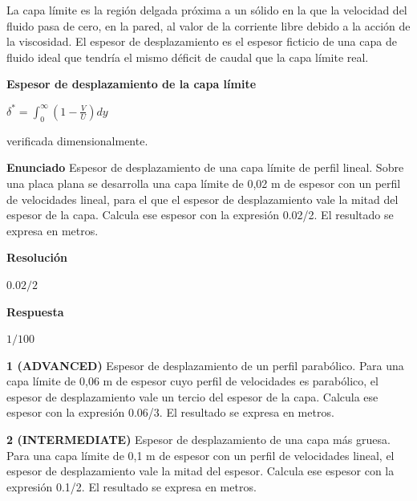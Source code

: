 \documentclass{book}
\begin{document}
\begin{tcolorbox}[title={Definición}, studiumdef, breakable]

La capa límite es la región delgada próxima a un sólido en la que la velocidad del fluido pasa de cero, en la pared, al valor de la corriente libre debido a la acción de la viscosidad. El espesor de desplazamiento es el espesor ficticio de una capa de fluido ideal que tendría el mismo déficit de caudal que la capa límite real.
\end{tcolorbox}

\begin{tcolorbox}[title={Derivaciones}, studiumdef, breakable]

\noindent\textbf{Espesor de desplazamiento de la capa límite}

\(\delta^{*} = \int_{0}^{\infty}\left(1 - \frac{V}{U}\right) dy\)

\noindent\footnotesize verificada dimensionalmente.
\end{tcolorbox}

\begin{tcolorbox}[title={Problema resuelto}, studiumworked, breakable]

\noindent\textbf{Enunciado}
Espesor de desplazamiento de una capa límite de perfil lineal. Sobre una placa plana se desarrolla una capa límite de 0,02 m de espesor con un perfil de velocidades lineal, para el que el espesor de desplazamiento vale la mitad del espesor de la capa. Calcula ese espesor con la expresión 0.02/2. El resultado se expresa en metros.

\noindent\textbf{Resolución}

\(0.02/2\)

\noindent\textbf{Respuesta}

\(1/100\)
\end{tcolorbox}

\begin{tcolorbox}[title={Ejercicios}, studiumworked, breakable]

\noindent\textbf{1 (ADVANCED)}
Espesor de desplazamiento de un perfil parabólico. Para una capa límite de 0,06 m de espesor cuyo perfil de velocidades es parabólico, el espesor de desplazamiento vale un tercio del espesor de la capa. Calcula ese espesor con la expresión 0.06/3. El resultado se expresa en metros.

\noindent\textbf{2 (INTERMEDIATE)}
Espesor de desplazamiento de una capa más gruesa. Para una capa límite de 0,1 m de espesor con un perfil de velocidades lineal, el espesor de desplazamiento vale la mitad del espesor. Calcula ese espesor con la expresión 0.1/2. El resultado se expresa en metros.
\end{tcolorbox}
\end{document}
